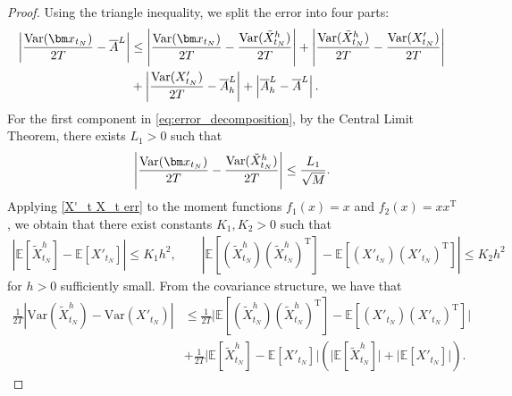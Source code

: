 \documentclass[12pt,a4paper,reqno]{amsart}
\numberwithin{equation}{section}
\begin{document}
\begin{proof}
    Using the triangle inequality, we split the error into four parts:
    \begin{equation}\label{eq:error_decomposition}
    	\begin{aligned}
    		\left\lvert \frac{\mathrm{Var}(\bm x_{t_N})}{2T} - \overline{A}^L\right\rvert &\leq \left\lvert\frac{\mathrm{Var}(\bm x_{t_N})}{2T} - \frac{\mathrm{Var}(\Tilde{X}^h_{t_N})}{2T}\right\rvert +   \left\lvert \frac{\mathrm{Var}(\Tilde{X}^h_{t_N})}{2T} -\frac{\mathrm{Var}(X'_{t_N})}{2T}\right\rvert\\ &+  \left\lvert \frac{\mathrm{Var}(X'_{t_N})}{2T} - \overline{A}_h^L\right\rvert + \left\lvert \overline{A}_h^L - \overline{A}^L\right\rvert.
    	\end{aligned}
    \end{equation}	
For the first component in \eqref{eq:error_decomposition}, by the Central Limit Theorem, there exists $L_1 >0$ such that
    \begin{equation*}
        \left\lvert \frac{\mathrm{Var}(\bm x_{t_N})}{2T} - \frac{\mathrm{Var}(\Tilde{X}^h_{t_N})}{2T}\right\rvert \leq \frac{L_1}{\sqrt{M}}.
    \end{equation*}
    Applying \eqref{X'_t X_t err} to the moment functions $f_1(x) = x$ and $f_2(x) = xx^{\mathrm{T}}$, we obtain that there exist constants $K_1, K_2 >0$ such that
        \begin{align*}
             \left\lvert \mathbb{E}\left[\tilde{X}^h_{t_N}\right] -\mathbb{E}\left[X'_{t_N}\right]\right\rvert \leq K_1h^2,\qquad
             \left\lvert \mathbb{E}\left[\left(\tilde{X}^h_{t_N}\right)\left(\tilde{X}^h_{t_N}\right)^{\mathrm{T}}\right] -\mathbb{E}\left[\left(X'_{t_N}\right)\left(X'_{t_N}\right)^{\mathrm{T}}\right]\right\rvert \leq K_2h^2
        \end{align*}
    for $h>0$ sufficiently small. From the covariance structure, we have that
   \begin{align*}
\frac{1}{2T} \left\lvert \mathrm{Var}(\tilde{X}_{t_N}^h) - \mathrm{Var}(X'_{t_N}) \right\rvert 
&\leq \frac{1}{2T} \Big\lvert \mathbb{E}\left[\left(\tilde{X}^h_{t_N}\right)\left(\tilde{X}^h_{t_N}\right)^{\mathrm{T}}\right]
- \mathbb{E}\left[\left(X'_{t_N}\right)\left(X'_{t_N}\right)^{\mathrm{T}}\right] \Big\rvert \\ &+ \frac{1}{2T} \Big\lvert \mathbb{E}\left[\tilde{X}^h_{t_N}\right] - \mathbb{E}\left[X'_{t_N}\right] \Big\rvert
\left( \Big\lvert\mathbb{E}\left[\tilde{X}^h_{t_N}\right] \Big\rvert +  \Big\lvert\mathbb{E}\left[X'_{t_N}\right]\Big\rvert\right).

\end{align*}
\end{proof}
\end{document}
